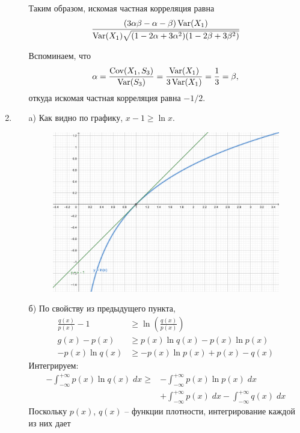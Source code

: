 \begin{enumerate}
\begin{enumerate}
Таким образом, искомая частная корреляция равна
\[
\frac{(3\alpha\beta - \alpha - \beta)\operatorname{Var}(X_1)}{\operatorname{Var}(X_1)\sqrt{(1 - 2\alpha + 3\alpha^2)(1 - 2\beta + 3\beta^2)}}
\]

Вспоминаем, что
\[
\alpha = \frac{\operatorname{Cov}(X_1,S_3)}{\operatorname{Var}(S_3)} = \frac{\operatorname{Var}(X_1)}{3\operatorname{Var}(X_1)} = \frac{1}{3} = \beta,
\]
откуда искомая частная корреляция равна $-1/2$.
\end{enumerate}
\item
\begin{enumerate}
\item[a)] Как видно по графику, $x-1\geq \ln x$.
\begin{figure}[ht!]
\begin{center}
\includegraphics[]{images/sol_kr_3_ip.png}
\end{center}
\end{figure}
\item[б)] По свойству из предыдущего пункта,
\begin{align*}
\frac{q(x)}{p(x)} - 1 &\geq \ln \left(\frac{q(x)}{p(x)}\right) \\
g(x)-p(x) &\geq p(x)\ln q(x)-p(x)\ln p(x) \\
-p(x)\ln q(x) & \geq -p(x)\ln p(x) + p(x) - q(x)
\end{align*}
Интегрируем:
\begin{align*}
-\int^{+\infty}_{-\infty}p(x)\ln q(x) \; dx \geq &-\int^{+\infty}_{-\infty}p(x)\ln p(x) \; dx \\
&+\int^{+\infty}_{-\infty}p(x) \; dx - \int^{+\infty}_{-\infty}q(x) \; dx
\end{align*}
Поскольку $p(x)$, $q(x)$ – функции плотности, интегрирование каждой из них дает

\end{enumerate}
\end{enumerate}
